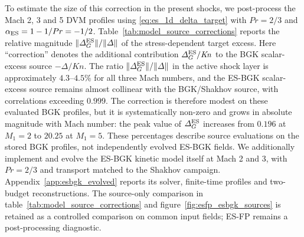 \documentclass[lineno,paper]{JFM-FLM_Au}
\newcommand{\Kn}{\mathit{Kn}}
\begin{document}
To estimate the size of this correction in the present shocks, we post-process the Mach 2, 3 and 5 DVM profiles using \eqref{eq:es_1d_delta_target} with $Pr=2/3$ and $\alpha_{\rm ES}=1-1/Pr=-1/2$.  Table~\ref{tab:model_source_corrections} reports the relative
magnitude $\|\Delta_G^{\rm ES}\|/\|\Delta\|$ of the
stress-dependent target excess. Here ``correction'' denotes
the additional contribution $\Delta_G^{\rm ES}/\Kn$ to the
BGK scalar-excess source $-\Delta/\Kn$. The ratio $\|\Delta_G^{\rm ES}\|/\|\Delta\|$ in the active shock layer is approximately $4.3$--$4.5\%$ for all three Mach numbers, and the ES-BGK scalar-excess source remains almost collinear with the BGK/Shakhov source, with correlations exceeding $0.999$.  The correction is therefore modest on these evaluated BGK profiles, but it is systematically non-zero and grows in absolute magnitude with Mach number: the peak value of $\Delta_G^{\rm ES}$ increases from $0.196$ at $M_1=2$ to $20.25$ at $M_1=5$.  These percentages describe source evaluations on the stored BGK profiles, not independently evolved ES-BGK fields. We additionally implement and evolve the ES-BGK kinetic model itself at Mach 2 and 3, with $Pr=2/3$ and transport matched to the Shakhov campaign. Appendix~\ref{app:esbgk_evolved} reports its solver, finite-time profiles and two-budget reconstructions. The source-only comparison in table~\ref{tab:model_source_corrections} and figure~\ref{fig:esfp_esbgk_sources} is retained as a controlled comparison on common input fields; ES-FP remains a post-processing diagnostic.
\end{document}
